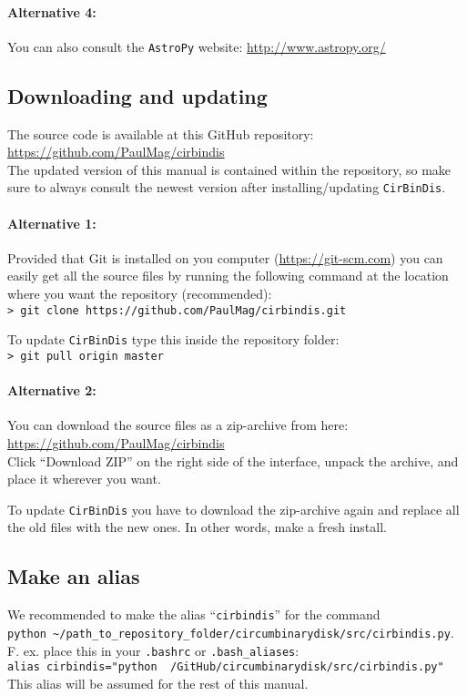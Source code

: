 \documentclass[a4paper, 12pt, english, titlepage]{article}
\newcommand{\sname}{\texttt{CirBinDis}\xspace}
\begin{document}
        \paragraph{Alternative 4:}
        You can also consult the \texttt{AstroPy} website: 
        \url{http://www.astropy.org/}


\subsection{Downloading and updating}
    \label{sec:downloading}

    The source code is available at this GitHub repository: \\
    \url{https://github.com/PaulMag/cirbindis} \\
    The updated version of this manual is contained within the repository, so make sure to always consult the newest version after installing/updating \sname. 

    \paragraph{Alternative 1:}
    Provided that Git is installed on you computer (\url{https://git-scm.com}) you can easily get all the source files by running the following command at the location where you want the repository (recommended): \\
    \texttt{> git clone https://github.com/PaulMag/cirbindis.git}
    
    To update \sname type this inside the repository folder: \\
    \texttt{> git pull origin master}

    \paragraph{Alternative 2:}
    You can download the source files as a zip-archive from here: \\
    \url{https://github.com/PaulMag/cirbindis} \\
    Click ``Download ZIP'' on the right side of the interface,
    unpack the archive, and place it wherever you want.

    To update \sname you have to download the zip-archive again and replace all the old files with the new ones. In other words, make a fresh install.


\subsection{Make an alias}
    We recommended to make the alias ``\texttt{cirbindis}'' for the command \\
    \texttt{python \textasciitilde/path\_to\_repository\_folder/circumbinarydisk/src/cirbindis.py}. \\
    F. ex. place this in your \texttt{.bashrc} or \texttt{.bash\_aliases}: \\
    \texttt{alias cirbindis="python ~/GitHub/circumbinarydisk/src/cirbindis.py"} \\
    This alias will be assumed for the rest of this manual.
\end{document}
